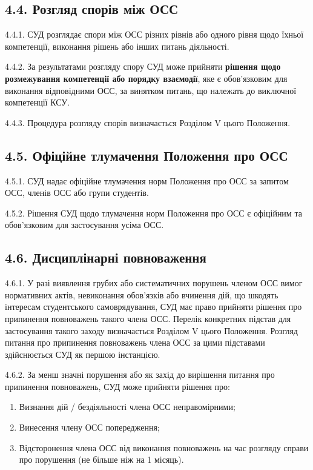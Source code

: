 \subsection*{4.4. Розгляд спорів між ОСС}
    4.4.1. СУД розглядає спори між ОСС різних рівнів або одного рівня щодо їхньої компетенції, виконання рішень або інших питань діяльності.

    4.4.2. За результатами розгляду спору СУД може прийняти \textbf{рішення щодо розмежування компетенції або порядку взаємодії}, яке є обов'язковим для виконання відповідними ОСС, за винятком питань, що належать до виключної компетенції КСУ.

    4.4.3. Процедура розгляду спорів визначається Розділом V цього Положення.

\subsection*{4.5. Офіційне тлумачення Положення про ОСС}
    4.5.1. СУД надає офіційне тлумачення норм Положення про ОСС за запитом ОСС, членів ОСС або групи студентів.

    4.5.2. Рішення СУД щодо тлумачення норм Положення про ОСС є офіційним та обов'язковим для застосування усіма ОСС.

\subsection*{4.6. Дисциплінарні повноваження}
    4.6.1. У разі виявлення грубих або систематичних порушень членом ОСС вимог нормативних актів, невиконання обов'язків або вчинення дій, що шкодять інтересам студентського самоврядування, СУД має право прийняти рішення про припинення повноважень такого члена ОСС. Перелік конкретних підстав для застосування такого заходу визначається Розділом V цього Положення. Розгляд питання про припинення повноважень члена ОСС за цими підставами здійснюється СУД як першою інстанцією.

    4.6.2. За менш значні порушення або як захід до вирішення питання про припинення повноважень, СУД може прийняти рішення про:

        \begin{enumerate}[label=\alph*)]
            \item Визнання дій / бездіяльності члена ОСС неправомірними;
            \item Винесення члену ОСС попередження;
            \item Відсторонення члена ОСС від виконання повноважень на час розгляду справи про порушення (не більше ніж на 1 місяць).
        \end{enumerate}

